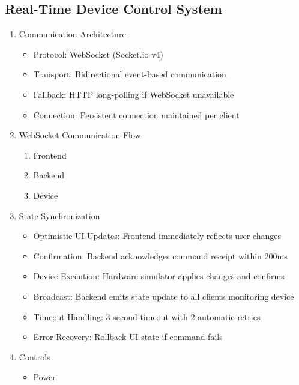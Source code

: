 \documentclass[conference]{IEEEtran}
\begin{document}
    \subsection{\textbf{Real-Time Device Control System}}
        \begin{enumerate}
            \item Communication Architecture
                \begin{itemize}
                    \item Protocol: WebSocket (Socket.io v4)
                    \item Transport: Bidirectional event-based communication
                    \item Fallback: HTTP long-polling if WebSocket unavailable
                    \item Connection: Persistent connection maintained per client
                \end{itemize}
            \item WebSocket Communication Flow
                \begin{enumerate}
                    \item Frontend
                    \item Backend
                    \item Device
                \end{enumerate}
            \item State Synchronization
                \begin{itemize}
                    \item Optimistic UI Updates: Frontend immediately reflects user changes 
                    \item Confirmation: Backend acknowledges command receipt within 200ms
                    \item Device Execution: Hardware simulator applies changes and confirms
                    \item Broadcast: Backend emits state update to all clients monitoring device
                    \item Timeout Handling: 3-second timeout with 2 automatic retries
                    \item Error Recovery: Rollback UI state if command fails
                \end{itemize}
            \item Controls
                \begin{itemize}
                    \item Power 

\end{itemize}
\end{enumerate}
\end{document}
